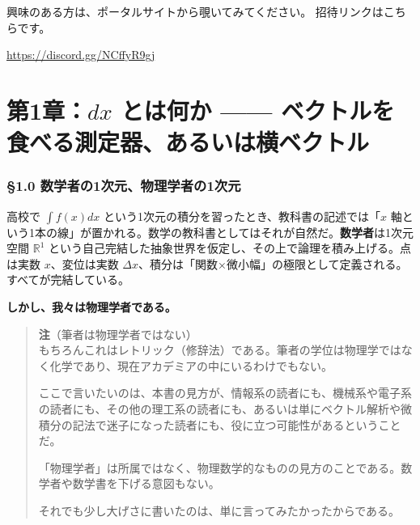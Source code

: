 \documentclass[a4paper,12pt,openany]{book}
\begin{document}
興味のある方は、ポータルサイトから覗いてみてください。
招待リンクはこちらです。

\url{https://discord.gg/NCffyR9gj}

\newpage


\mainmatter
\hypertarget{ux7b2c1ux7ae0dx-ux3068ux306fux4f55ux304b-ux30d9ux30afux30c8ux30ebux3092ux98dfux3079ux308bux6e2cux5b9aux5668ux3042ux308bux3044ux306fux6a2aux30d9ux30afux30c8ux30eb}{%
\chapter{\texorpdfstring{第1章：\(dx\) とは何か ——
ベクトルを食べる測定器、あるいは横ベクトル}{第1章：dx とは何か —— ベクトルを食べる測定器、あるいは横ベクトル}}\label{ux7b2c1ux7ae0dx-ux3068ux306fux4f55ux304b-ux30d9ux30afux30c8ux30ebux3092ux98dfux3079ux308bux6e2cux5b9aux5668ux3042ux308bux3044ux306fux6a2aux30d9ux30afux30c8ux30eb}}

\hypertarget{ux6570ux5b66ux8005ux306e1ux6b21ux5143ux7269ux7406ux5b66ux8005ux306e1ux6b21ux5143}{%
\subsection{§1.0
数学者の1次元、物理学者の1次元}\label{ux6570ux5b66ux8005ux306e1ux6b21ux5143ux7269ux7406ux5b66ux8005ux306e1ux6b21ux5143}}

高校で \(\int f(x) dx\)
という1次元の積分を習ったとき、教科書の記述では「\(x\)
軸という1本の線」が置かれる。数学の教科書としてはそれが自然だ。\textbf{数学者}は1次元空間
\(\mathbb{R}^1\)
という自己完結した抽象世界を仮定し、その上で論理を積み上げる。点は実数
\(x\)、変位は実数
\(\Delta x\)、積分は「関数×微小幅」の極限として定義される。すべてが完結している。

\textbf{しかし、我々は物理学者である。}

\begin{quote}
\textbf{注}（筆者は物理学者ではない）\\
もちろんこれはレトリック（修辞法）である。筆者の学位は物理学ではなく化学であり、現在アカデミアの中にいるわけでもない。

ここで言いたいのは、本書の見方が、情報系の読者にも、機械系や電子系の読者にも、その他の理工系の読者にも、あるいは単にベクトル解析や微積分の記法で迷子になった読者にも、役に立つ可能性があるということだ。

「物理学者」は所属ではなく、物理数学的なものの見方のことである。数学者や数学書を下げる意図もない。

それでも少し大げさに書いたのは、単に言ってみたかったからである。
\end{quote}
\end{document}
